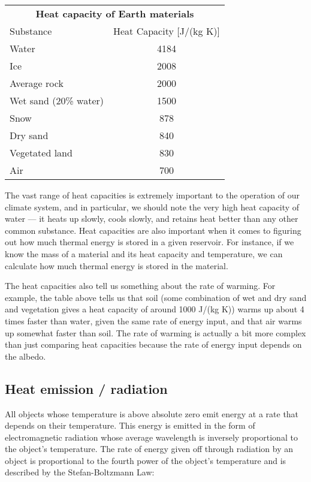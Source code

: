 \documentclass[11pt,letterpaper]{article}
\begin{document}
\begin{table}[h]
\begin{tabular}{lc}
\multicolumn{2}{c}{\textbf{Heat capacity of Earth materials}}\\
Substance & Heat Capacity [J/(kg K)]\\
\hline
Water & 4184\\
Ice & 2008\\
Average rock & 2000\\
Wet sand (20\% water) & 1500\\
Snow & 878\\
Dry sand & 840\\
Vegetated land & 830\\
Air & 700\\
\hline
\end{tabular}
\end{table}

The vast range of heat capacities is extremely important to the operation of our climate system, and in particular, we should note the
very high heat capacity of water --- it heats up slowly, cools slowly, and retains heat better than any other common substance. Heat
capacities are also important when it comes to figuring out how much thermal energy is stored in a given reservoir. For instance, if we
know the mass of a material and its heat capacity and temperature, we can calculate how much thermal energy is stored in the
material.

The heat capacities also tell us something about the rate of warming. For example, the table above tells us that soil (some
combination of wet and dry sand and vegetation gives a heat capacity of around 1000 J/(kg K)) warms up about 4 times faster than water, given
the same rate of energy input, and that air warms up somewhat faster than soil. The rate of warming is actually a bit more complex than just
comparing heat capacities because the rate of energy input depends on the albedo.

\subsection{Heat emission / radiation}
All objects whose temperature is above absolute zero emit energy at a rate that depends on their temperature. This energy is emitted in the
form of electromagnetic radiation whose average wavelength is inversely proportional to the object's temperature. The rate of energy
given off through radiation by an object is proportional to the fourth power of the object's temperature and is described by the Stefan-Boltzmann Law:
\end{document}
